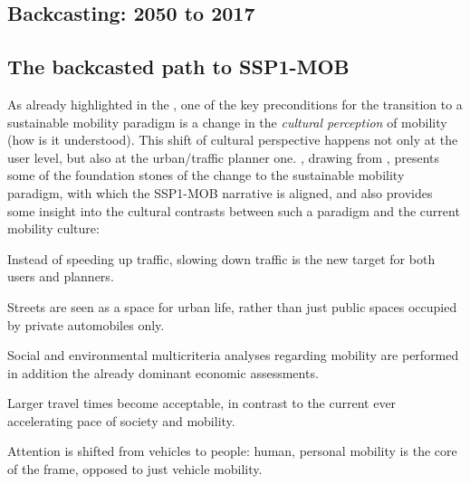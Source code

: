 \subsection{Backcasting: 2050 to 2017}
\label{ss:results:backcasting-2050-2017}

\subsection{The backcasted path to SSP1-MOB}
\label{ss:results:backcasting-the-path}
As already highlighted in the , one of the key preconditions for the transition to a sustainable mobility paradigm is a change in the \emph{cultural perception} of mobility (how is it understood). This shift of cultural perspective happens not only at the user level, but also at the urban/traffic planner one. \textcite{banister2008_sustainablemobilityparadigm}, drawing from \textcite{marshall2001_challengesustainabletransport}, presents some of the foundation stones of the change to the sustainable mobility paradigm, with which the SSP1-MOB narrative is aligned, and also provides some insight into the cultural contrasts between such a paradigm and the current mobility culture:
%
\begin{enumeratealpha}
\item Instead of speeding up traffic, slowing down traffic is the new target for both users and planners.
\item Streets are seen as a space for urban life, rather than just public spaces occupied by private automobiles only.
\item Social and environmental multicriteria analyses regarding mobility are performed in addition the already dominant economic assessments.
\item Larger travel times become acceptable, in contrast to the current ever accelerating pace of society and mobility.
\item Attention is shifted from vehicles to people: human, personal mobility is the core of the frame, opposed to just vehicle mobility.
\end{enumeratealpha}

